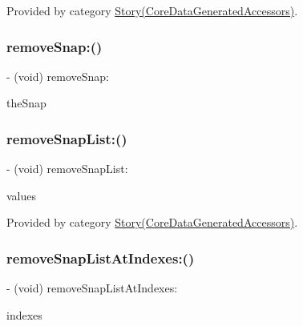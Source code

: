 Provided by category \hyperlink{category_story_07_core_data_generated_accessors_08_a2862a1453b5d1ec4410421feed5acfdd}{Story(\+Core\+Data\+Generated\+Accessors)}.

\hypertarget{interface_story_a8f71bc5c4f6847364d588bd2913755c4}{}\label{interface_story_a8f71bc5c4f6847364d588bd2913755c4} 
\subsubsection{\texorpdfstring{remove\+Snap\+:()}{removeSnap:()}}
{\footnotesize\ttfamily -\/ (void) remove\+Snap\+: \begin{DoxyParamCaption}\item[{(\hyperlink{interface_snap}{Snap} $\ast$)}]{the\+Snap }\end{DoxyParamCaption}}

\hypertarget{interface_story_a0d250a043b1896262bc08562ef7e889a}{}\label{interface_story_a0d250a043b1896262bc08562ef7e889a} 
\subsubsection{\texorpdfstring{remove\+Snap\+List\+:()}{removeSnapList:()}}
{\footnotesize\ttfamily -\/ (void) remove\+Snap\+List\+: \begin{DoxyParamCaption}\item[{(N\+S\+Ordered\+Set$<$ \hyperlink{interface_snap}{Snap} $\ast$ $>$ $\ast$)}]{values }\end{DoxyParamCaption}}



Provided by category \hyperlink{category_story_07_core_data_generated_accessors_08_a0d250a043b1896262bc08562ef7e889a}{Story(\+Core\+Data\+Generated\+Accessors)}.

\hypertarget{interface_story_a9c8c74f019b3ea3a94588064ea5fd7b6}{}\label{interface_story_a9c8c74f019b3ea3a94588064ea5fd7b6} 
\subsubsection{\texorpdfstring{remove\+Snap\+List\+At\+Indexes\+:()}{removeSnapListAtIndexes:()}}
{\footnotesize\ttfamily -\/ (void) remove\+Snap\+List\+At\+Indexes\+: \begin{DoxyParamCaption}\item[{(N\+S\+Index\+Set $\ast$)}]{indexes }\end{DoxyParamCaption}}



